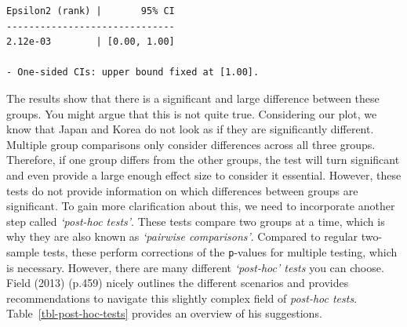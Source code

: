 \documentclass[
  letterpaper,
]{krantz}
\begin{document}
\begin{verbatim}
Epsilon2 (rank) |       95% CI
------------------------------
2.12e-03        | [0.00, 1.00]

- One-sided CIs: upper bound fixed at [1.00].
\end{verbatim}

The results show that there is a significant and large difference
between these groups. You might argue that this is not quite true.
Considering our plot, we know that Japan and Korea do not look as if
they are significantly different. Multiple group comparisons only
consider differences across all three groups. Therefore, if one group
differs from the other groups, the test will turn significant and even
provide a large enough effect size to consider it essential. However,
these tests do not provide information on which differences between
groups are significant. To gain more clarification about this, we need
to incorporate another step called \emph{`post-hoc tests'}. These tests
compare two groups at a time, which is why they are also known as
\emph{`pairwise comparisons'}. Compared to regular two-sample tests,
these perform corrections of the \texttt{p}-values for multiple testing,
which is necessary. However, there are many different \emph{`post-hoc'
tests} you can choose. Field (2013) (p.459) nicely outlines the
different scenarios and provides recommendations to navigate this
slightly complex field of \emph{post-hoc tests}.
Table~\ref{tbl-post-hoc-tests} provides an overview of his suggestions.
\end{document}
